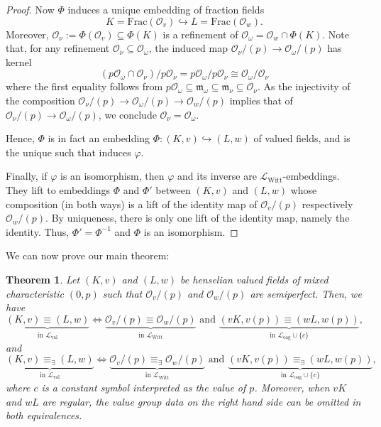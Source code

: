 \documentclass[a4paper]{amsart}
\theoremstyle{mystyle2}
\newtheorem{thm}{Theorem}[section]
\theoremstyle{mystyle}
\renewcommand{\L}{\mathcal{L}}
\newcommand{\LWitt}{\L_{\mathrm{Witt}}}
\renewcommand{\O}{\mathcal{O}}
\numberwithin{equation}{section}
\begin{document}
\begin{proof}
        Now $\Phi$ induces a unique embedding of fraction fields 
        $$K=\mathrm{Frac}(\O_v) \hookrightarrow L=\mathrm{Frac}(\O_w).$$ 
        Moreover, $\O_\nu:=\Phi(\O_v) \subseteq \Phi(K)$ is a refinement of 
        $\O_\omega = \O_w \cap \Phi(K)$. 
        Note that, for any refinement $\O_\nu \subseteq \O_\omega$, the induced map $\O_\nu/(p) \to \O_\omega/(p)$
        has kernel $$(p\O_\omega \cap \O_\nu)/p\O_\nu = p\O_\omega/p\O_\nu \cong \O_\omega/\O_\nu$$ where the first equality follows from 
        $p\O_\omega \subseteq \mathfrak{m}_\omega \subseteq \mathfrak{m}_\nu \subseteq  \O_\nu$. As the injectivity of the composition
        $\O_\nu/(p) \rightarrow \O_\omega/(p) \rightarrow \O_w/(p)$ implies 
        that of $\O_\nu/(p) \rightarrow \O_\omega/(p)$, we conclude
        $\O_\nu=\O_\omega$.
        
        Hence, $\Phi$ is in fact
        an embedding $\Phi\colon (K,v) \hookrightarrow (L,w)$ of valued fields,
        and is the unique such that induces $\varphi$.
        
        Finally, if $\varphi$ is an isomorphism, then \(\varphi\) and its inverse are $\LWitt$-embeddings. They lift to embeddings \(\Phi\) and \(\Phi'\) between \( (K,v) \) and \( (L,w) \) whose composition (in both ways) is a lift of the identity map of \(\O_v/(p)\) respectively \(\O_w/(p)\). 
        By uniqueness, there is only one lift of the identity map, namely the identity. 
        Thus, \(\Phi'=\Phi^{-1}\) and \(\Phi\) is an isomorphism.
    \end{proof}

    We can now prove our main theorem:
    \begin{thm}
        \label{thm:main}
        Let $(K,v)$ and $(L,w)$ be henselian valued fields of mixed characteristic 
        $(0,p)$ 
        such that $\O_v/(p)$ and $\O_w/(p)$ are semiperfect. Then, we have
        $$\underbrace{(K,v) \equiv (L,w)}_{\text{in }\mathcal{L}_\mathrm{val}} \Longleftrightarrow \underbrace{\mathcal{O}_v/(p) \equiv \mathcal{O}_w/(p)}_{\text{in }\mathcal{L}_{\mathrm{Witt}}}\textrm{ and } \underbrace{(vK,v(p)) 
        \equiv (wL,w(p))}_{\text{in }\mathcal{L}_{\mathrm{oag}}\cup\{c\}},$$
        and 
        $$\underbrace{(K,v) \equiv_\exists (L,w)}_{\text{in }\mathcal{L}_\mathrm{val}} \Longleftrightarrow \underbrace{\mathcal{O}_v/(p) \equiv_\exists \mathcal{O}_w/(p)}_{\text{in }\mathcal{L}_{\mathrm{Witt}}}\textrm{ and } \underbrace{(vK,v(p)) \equiv_\exists (wL,w(p))}_{\text{in }\mathcal{L}_{\mathrm{oag}}\cup\{c\}},$$
        where $c$ is a constant symbol interpreted as the value of $p$.
        Moreover, when $vK$ and $wL$ are regular, the value group data on the right hand side can be omitted in both equivalences.
    \end{thm}
\end{document}
